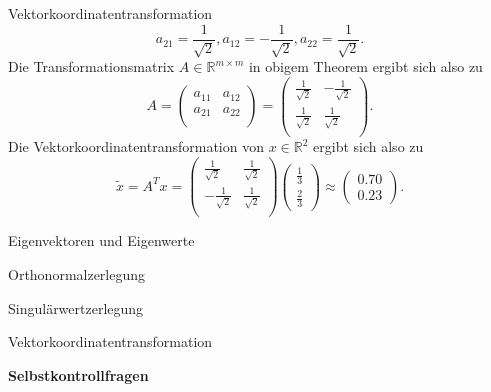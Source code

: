 \documentclass[
  8pt,
  ignorenonframetext,
]{beamer}
\begin{document}
\begin{frame}{Vektorkoordinatentransformation}
\begin{equation}
a_{21} =  \frac{1}{\sqrt{2}},
a_{12} = -\frac{1}{\sqrt{2}},
a_{22} =  \frac{1}{\sqrt{2}}.
\end{equation} Die Transformationsmatrix
\(A \in \mathbb{R}^{m \times m}\) in obigem Theorem ergibt sich also zu
\begin{equation}
A =
\begin{pmatrix}
a_{11} & a_{12} \\
a_{21} & a_{22} \\
\end{pmatrix}
=
\begin{pmatrix}
\frac{1}{\sqrt{2}} & -\frac{1}{\sqrt{2}} \\
\frac{1}{\sqrt{2}} &  \frac{1}{\sqrt{2}} \\
\end{pmatrix}.
\end{equation} Die Vektorkoordinatentransformation von
\(x \in \mathbb{R}^2\) ergibt sich also zu \begin{equation}
\tilde{x}
= A^T x
= \begin{pmatrix}
\frac{1}{\sqrt{2}} & \frac{1}{\sqrt{2}}     \\
-\frac{1}{\sqrt{2}} &  \frac{1}{\sqrt{2}}   \\
\end{pmatrix}
\begin{pmatrix}
\frac{1}{3} \\
\frac{2}{3}
\end{pmatrix}
\approx
\begin{pmatrix}
0.70 \\
0.23
\end{pmatrix}.
\end{equation}
\end{frame}

\begin{frame}{}
\protect\hypertarget{section-7}{}
\vfill
{}
\Large

Eigenvektoren und Eigenwerte

Orthonormalzerlegung

Singulärwertzerlegung

Vektorkoordinatentransformation

\textbf{Selbstkontrollfragen} \vfill 
\end{frame}
\end{document}
